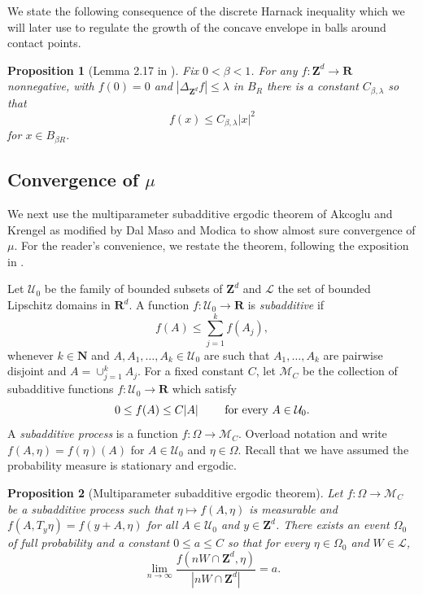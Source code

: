 \documentclass[12pt]{amsart}
\newcommand{\R}{\mathbf{R}}
\newcommand{\Z}{\mathbf{Z}}
\newcommand{\N}{\mathbf{N}}
\newtheorem{prop}{Proposition}[section]
\begin{document}
We state the following consequence of the discrete Harnack inequality \cite{lawler2010random} which we will later use to regulate the growth of the concave envelope in balls around contact points. 

\begin{prop}[Lemma 2.17 in \cite{levine2010scaling}] \label{harnack}
Fix $0 < \beta < 1$. For any $f: \Z^d \to \R$ nonnegative, with $f(0) = 0$ and $|\Delta_{\Z^d} f| \leq \lambda$ in $B_R$  there is a constant $C_{\beta,\lambda}$ so that
\begin{equation} \label{harnack_eq}
f(x) \leq C_{\beta,\lambda}  |x|^2
\end{equation}
for $x \in B_{\beta R}$.
\end{prop}


\subsection{Convergence of $\mu$}


We next use the multiparameter subadditive ergodic theorem of Akcoglu and Krengel \cite{akcoglu1981ergodic}
as modified by Dal Maso and Modica \cite{dal1985nonlinear} to show almost sure convergence of $\mu$. 
For the reader's convenience, we restate the theorem, following 
the exposition in \cite{armstrong2014regularity}. 

Let $\mathcal{U}_0$ be the family of bounded subsets of $\Z^d$ and $\mathcal{L}$ the set 
of bounded Lipschitz domains in $\R^d$. A function $f: \mathcal{U}_0 \to \R$ 
is {\it subadditive} if 
\[
f(A) \leq \sum_{j=1}^{k} f(A_j), 
\]
whenever $k \in \N$ and $A, A_1, \ldots, A_k \in \mathcal{U}_0$ are such that $A_1, \ldots, A_k$ are pairwise disjoint and $A = \cup_{j=1}^k A_j$. For a fixed constant $C$, let $\mathcal{M}_C$
be the collection of subadditive functions $f: \mathcal{U}_0 \to \R$ which satisfy 
\[
0 \leq f(A) \leq C |A| \mbox { \qquad for every $A \in \mathcal{U}_0$}.
\]
A {\it subadditive process} is a function $f: \Omega \to \mathcal{M}_C$. Overload notation and write 
$f(A, \eta) = f(\eta)(A)$ for $A \in \mathcal{U}_0$ and $\eta \in \Omega$. Recall that we have assumed the probability measure is stationary and ergodic. 



\begin{prop}[Multiparameter subadditive ergodic theorem] \label{prop:subadditive}
	Let $f: \Omega \to \mathcal{M}_C$ be a subadditive process such that $\eta \mapsto f(A, \eta)$ is measurable and $f(A, T_y \eta) = f(y + A, \eta)$ for all $A \in \mathcal{U}_0$ and $y \in \Z^d$. There exists %
	an event $\Omega_0$ of full probability and a constant $0 \leq a \leq C$ so
	that for every $\eta \in \Omega_0$ and $W \in \mathcal{L}$, 
	\begin{equation}
	\lim_{n \to \infty} \frac{f(n W \cap \Z^d, \eta)}{|n W \cap \Z^d|} = a. 
	\end{equation}
	
\end{prop}
\end{document}

